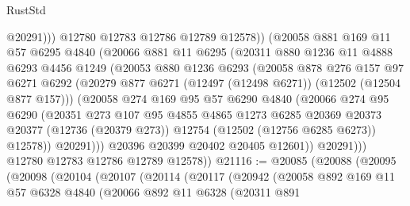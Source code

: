 \begin{lexlean}{RustStd}
\begin{coremodule}
                      @20291)))
                @12780
                @12783
                @12786
                @12789
                @12578))
            (@20058
              @881
              @169
              @11
              @57
              @6295
              @4840
              (@20066
                @881
                @11
                @6295
                (@20311
                  @880
                  @1236
                  @11
                  @4888
                  @6293
                  @4456
                  @1249
                  (@20053
                    @880
                    @1236
                    @6293
                    (@20058
                      @878
                      @276
                      @157
                      @97
                      @6271
                      @6292
                      (@20279 @877 @6271 (@12497 (@12498 @6271)) (@12502 (@12504 @877 @157)))
                      (@20058
                        @274
                        @169
                        @95
                        @57
                        @6290
                        @4840
                        (@20066
                          @274
                          @95
                          @6290
                          (@20351
                            @273
                            @107
                            @95
                            @4855
                            @4865
                            @1273
                            @6285
                            @20369
                            @20373
                            @20377
                            (@12736 (@20379 @273))
                            @12754
                            (@12502 (@12756 @6285 @6273))
                            @12578))
                        @20291)))
                  @20396
                  @20399
                  @20402
                  @20405
                  @12601))
              @20291)))
        @12780
        @12783
        @12786
        @12789
        @12578))
@21116 := @20085
    (@20088
      (@20095
        (@20098
          (@20104
            (@20107
              (@20114
                (@20117
                  (@20942
                    (@20058
                      @892
                      @169
                      @11
                      @57
                      @6328
                      @4840
                      (@20066
                        @892
                        @11
                        @6328
                        (@20311
                          @891

\end{coremodule}
\end{lexlean}
